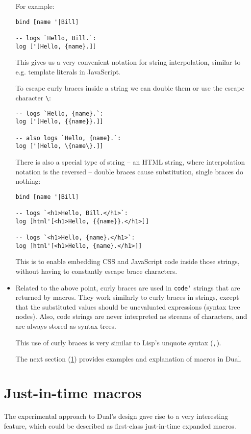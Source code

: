 \begin{itemize}
    For example:
\begin{lstlisting}
bind [name '|Bill]

-- logs `Hello, Bill.`:
log ['[Hello, {name}.]]
\end{lstlisting}
    
    This gives us a very convenient notation for string
    interpolation, similar to e.g. template literals in
    JavaScript\cite{mdn_template_strings}.
    
    To escape curly braces inside a string we can double them or use the escape character \texttt{\textbackslash}:
\begin{lstlisting}
-- logs `Hello, {name}.`:
log ['[Hello, {{name}}.]]

-- also logs `Hello, {name}.`:
log ['[Hello, \{name\}.]]
\end{lstlisting}
    
    There is also a special type of string -- an HTML string, where interpolation notation is the reversed -- double braces cause substitution, single braces do nothing:
\begin{lstlisting}
bind [name '|Bill]

-- logs `<h1>Hello, Bill.</h1>`:
log [html'[<h1>Hello, {{name}}.</h1>]]

-- logs `<h1>Hello, {name}.</h1>`:
log [html'[<h1>Hello, {name}.</h1>]]
\end{lstlisting}
    
    This is to enable embedding CSS and JavaScript code inside those strings,
    without having to constantly escape brace characters.
    
    \item Related to the above point, curly braces are used in \texttt{code'} strings that are returned by macros. They work similarly to curly braces in strings, except that the substituted values should be unevaluated expressions (syntax tree nodes). Also, code strings are never interpreted as streams of characters, and are always stored as syntax trees.
    
    This use of curly braces is very similar to Lisp's unquote syntax (\texttt{,})\cite[Section~1.3.8]{racket_reference}.
    
    The next section (\ref{sec:mac}) provides examples and explanation of macros in Dual.
\end{itemize}

\section{Just-in-time macros}\label{sec:mac}
The experimental approach to Dual's design gave rise to a very interesting feature, which could be described as first-class just-in-time expanded macros.

